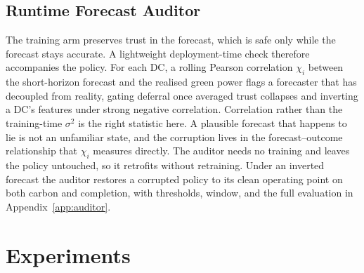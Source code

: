 \documentclass{article} %
\begin{document}
\subsection{Runtime Forecast Auditor}
\label{sec:auditor}
The training arm preserves trust in the forecast, which is safe only while the forecast stays accurate. A lightweight deployment-time check therefore accompanies the policy. For each DC, a rolling Pearson correlation $\chi_i$ between the short-horizon forecast and the realised green power flags a forecaster that has decoupled from reality, gating deferral once averaged trust collapses and inverting a DC's features under strong negative correlation. Correlation rather than the training-time $\sigma^2$ is the right statistic here. A plausible forecast that happens to lie is not an unfamiliar state, and the corruption lives in the forecast--outcome relationship that $\chi_i$ measures directly. The auditor needs no training and leaves the policy untouched, so it retrofits without retraining. Under an inverted forecast the auditor restores a corrupted policy to its clean operating point on both carbon and completion, with thresholds, window, and the full evaluation in Appendix~\ref{app:auditor}.

\section{Experiments}

\label{sec:experiments}
\end{document}
